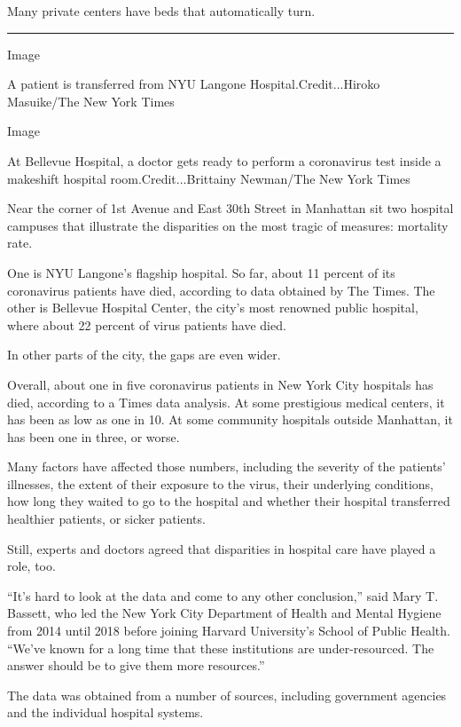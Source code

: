 Many private centers have beds that automatically turn.

\begin{center}\rule{0.5\linewidth}{\linethickness}\end{center}

Image

A patient is transferred from NYU Langone Hospital.Credit...Hiroko
Masuike/The New York Times

Image

At Bellevue Hospital, a doctor gets ready to perform a coronavirus test
inside a makeshift hospital room.Credit...Brittainy Newman/The New York
Times

Near the corner of 1st Avenue and East 30th Street in Manhattan sit two
hospital campuses that illustrate the disparities on the most tragic of
measures: mortality rate.

One is NYU Langone's flagship hospital. So far, about 11 percent of its
coronavirus patients have died, according to data obtained by The Times.
The other is Bellevue Hospital Center, the city's most renowned public
hospital, where about 22 percent of virus patients have died.

In other parts of the city, the gaps are even wider.

Overall, about one in five coronavirus patients in New York City
hospitals has died, according to a Times data analysis. At some
prestigious medical centers, it has been as low as one in 10. At some
community hospitals outside Manhattan, it has been one in three, or
worse.

Many factors have affected those numbers, including the severity of the
patients' illnesses, the extent of their exposure to the virus, their
underlying conditions, how long they waited to go to the hospital and
whether their hospital transferred healthier patients, or sicker
patients.

Still, experts and doctors agreed that disparities in hospital care have
played a role, too.

``It's hard to look at the data and come to any other conclusion,'' said
Mary T. Bassett, who led the New York City Department of Health and
Mental Hygiene from 2014 until 2018 before joining Harvard University's
School of Public Health. ``We've known for a long time that these
institutions are under-resourced. The answer should be to give them more
resources.''

The data was obtained from a number of sources, including government
agencies and the individual hospital systems.

